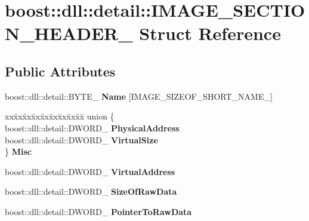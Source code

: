 \hypertarget{a00150}{}\section{boost\+:\+:dll\+:\+:detail\+:\+:I\+M\+A\+G\+E\+\_\+\+S\+E\+C\+T\+I\+O\+N\+\_\+\+H\+E\+A\+D\+E\+R\+\_\+ Struct Reference}
\label{a00150}
\subsection*{Public Attributes}
\begin{DoxyCompactItemize}
\item 
boost\+::dll\+::detail\+::\+B\+Y\+T\+E\+\_\+ {\bfseries Name} \mbox{[}I\+M\+A\+G\+E\+\_\+\+S\+I\+Z\+E\+O\+F\+\_\+\+S\+H\+O\+R\+T\+\_\+\+N\+A\+M\+E\+\_\+\mbox{]}\hypertarget{a00150_aec8a143be7ba929e96b578861cb831a9}{}\label{a00150_aec8a143be7ba929e96b578861cb831a9}

\item 
\begin{tabbing}
xx\=xx\=xx\=xx\=xx\=xx\=xx\=xx\=xx\=\kill
union \{\\
\>boost::dll::detail::DWORD\_ {\bfseries PhysicalAddress}\\
\>boost::dll::detail::DWORD\_ {\bfseries VirtualSize}\\
\} {\bfseries Misc}\hypertarget{a00150_a57d9142484a367c9aad8bf27d038ba33}{}\label{a00150_a57d9142484a367c9aad8bf27d038ba33}
\\

\end{tabbing}\item 
boost\+::dll\+::detail\+::\+D\+W\+O\+R\+D\+\_\+ {\bfseries Virtual\+Address}\hypertarget{a00150_a35eccaade9e46aa496b3dac07499fe39}{}\label{a00150_a35eccaade9e46aa496b3dac07499fe39}

\item 
boost\+::dll\+::detail\+::\+D\+W\+O\+R\+D\+\_\+ {\bfseries Size\+Of\+Raw\+Data}\hypertarget{a00150_afa69e63f2937f44f97ac23666be9d41e}{}\label{a00150_afa69e63f2937f44f97ac23666be9d41e}

\item 
boost\+::dll\+::detail\+::\+D\+W\+O\+R\+D\+\_\+ {\bfseries Pointer\+To\+Raw\+Data}\hypertarget{a00150_ac6df0a4de0101e07e9a7acda52a37e79}{}\label{a00150_ac6df0a4de0101e07e9a7acda52a37e79}


\end{DoxyCompactItemize}
